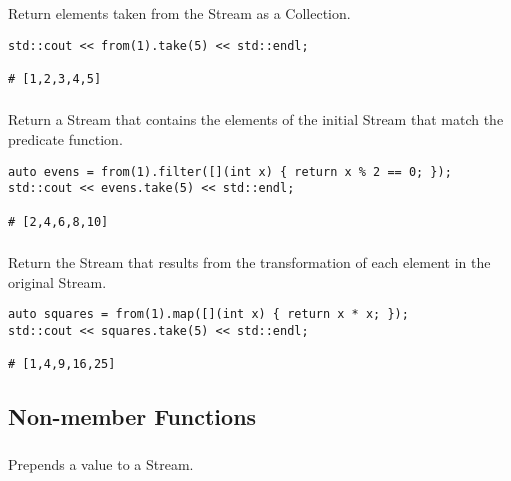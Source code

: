 \subsubsection{}

Return  elements taken from the Stream as a Collection.

\begin{lstlisting}[title=example]
std::cout << from(1).take(5) << std::endl;

# [1,2,3,4,5]
\end{lstlisting}

\subsubsection{}

Return a Stream that contains the elements of the initial Stream that match the predicate function.

\begin{lstlisting}[title=example]
auto evens = from(1).filter([](int x) { return x % 2 == 0; });
std::cout << evens.take(5) << std::endl;

# [2,4,6,8,10]
\end{lstlisting}

\subsubsection{}

Return the Stream that results from the transformation of each element in the original Stream.

\begin{lstlisting}[title=example]
auto squares = from(1).map([](int x) { return x * x; });
std::cout << squares.take(5) << std::endl;

# [1,4,9,16,25]
\end{lstlisting}

\subsection{Non-member Functions}

\subsubsection{}

Prepends a value to a Stream.

